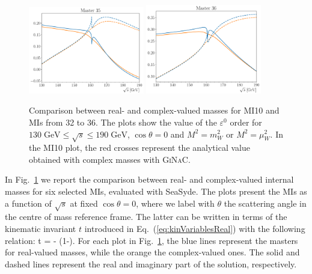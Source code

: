 \documentclass[final,1p,times]{elsarticle}
\begin{document}
\begin{figure}[ht!]
    \includegraphics[width=0.45\textwidth]{master35.pdf}
    \includegraphics[width=0.45\textwidth]{master36.pdf}
    \caption{Comparison between real- and complex-valued masses for MI10 and MIs from 32 to 36. The plots show the value of the $\varepsilon^0$ order  for $130 \; \text{GeV} \le \sqrt{s} \le 190\;\text{GeV}$, $\cos\theta=0$ and $M^2=m_W^2$ or $M^2=\mu_W^2$. 
    In the MI10 plot, the red crosses represent the analytical value obtained with complex masses with \textsc{GiNaC}.}
    \label{fig:compReCoMass}
\end{figure}

In Fig.~\ref{fig:compReCoMass} we report the comparison between real- and complex-valued internal masses for six selected MIs, evaluated with {\sc SeaSyde}.
The plots present the MIs as a function of $\sqrt{s}$ at fixed $\cos\theta=0$, where we label with $\theta$ the scattering angle in the centre of mass reference frame.
The latter can be written in terms of the kinematic invariant $t$ introduced in Eq.~(\ref{eq:kinVariablesReal}) with the following relation:
\be
    t = - \left(1-\cos\theta \right).
    \label{eq:relationTCostheta}
\ee
For each plot in Fig.~\ref{fig:compReCoMass}, the blue lines represent the masters for real-valued masses, while the orange the complex-valued ones. The solid and dashed lines represent the real and imaginary part of the solution, respectively.
\end{document}
